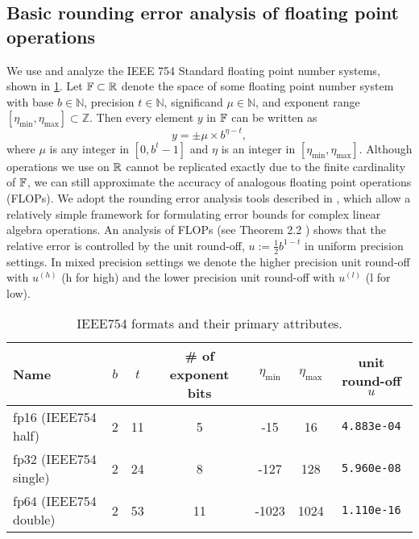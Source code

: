 \subsection{Basic rounding error analysis of floating point operations}\label{sec:backgroundRE}
We use and analyze the IEEE 754 Standard floating point number systems, shown in \cref{table:ieee}.
Let $\mathbb{F} \subset \mathbb{R}$ denote the space of some floating point number system with base $b\in\mathbb{N}$, precision $t\in\mathbb{N}$, significand $\mu\in\mathbb{N}$, and exponent range $[\eta_{\text{min}}, \eta_{\text{max}}]\subset \mathbb{Z}$.
Then every element $y$ in $\mathbb{F}$ can be written as 
\begin{equation}
y = \pm \mu\times b^{\eta-t},
\label{eqn:FPbasic}
\end{equation} 
where $\mu$ is any integer in $[0,b^{t}-1]$ and $\eta$ is an integer in  $[\eta_{\text{min}}, \eta_{\text{max}}]$.
Although operations we use on $\mathbb{R}$ cannot be replicated exactly due to the finite cardinality of $\mathbb{F}$, we can still approximate the accuracy of analogous floating point operations (FLOPs).
We adopt the rounding error analysis tools described in \cite{Higham2002}, which allow a relatively simple framework for formulating error bounds for complex linear algebra operations. 
An analysis of FLOPs (see Theorem 2.2 \cite{Higham2002}) shows that the relative error is 
controlled by the unit round-off, $u:=\frac{1}{2}b^{1-t}$ in uniform precision settings. 
In mixed precision settings we denote the higher precision unit round-off with $u^{(h)}$ (h for high) and the lower precision unit round-off with $u^{(l)}$ (l for low).\par 
\vspace{-.3cm}
\begin{table}[H]
	\begin{tabular}{||l|c|c|c|c|c|c||} 
		\hline 
		Name & $b$ & $t$ & \# of exponent bits & $\eta_{\text{min}}$ & $\eta_{\text{max}}$ & unit round-off $u$ \\ \hline 
		fp16 (IEEE754 half)& 2 & 11 & 5 & -15 & 16  & {\tt 4.883e-04} \\ \hline 
		fp32 (IEEE754 single)& 2 & 24 & 8 & -127 & 128  & {\tt 5.960e-08} \\ \hline 
		fp64 (IEEE754 double)& 2 & 53 & 11 & -1023 & 1024 & {\tt 1.110e-16} \\ \hline 
	\end{tabular}
	\caption{IEEE754 formats and their primary attributes.} %
	\label{table:ieee}
\end{table}
\vspace{-.8cm}

